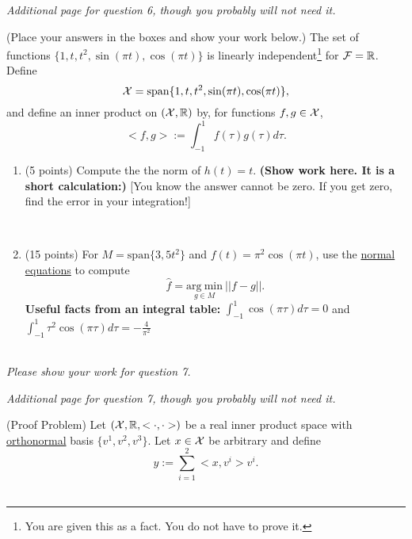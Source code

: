 \documentclass[letterpaper]{article}
\newcommand{\real}{\mathbb R}  %
\newcommand{\spanof}[1]{\textrm{span} \{ #1 \}}
\begin{document}
\newpage
\textit{Additional page for question 6, though you probably will not need it.}
\newpage

  (Place your answers in the boxes and show your work below.) The set of functions $\{1, t, t^2, \sin(\pi t),  \cos(\pi t) \}$ is linearly independent\footnote{You are given this as a fact. You do not have to prove it.} for ${\cal F}=\real$. Define
$$ {\cal X} = \spanof{1, t, t^2, \sin(\pi t),  \cos(\pi t) },$$
and define an inner product on $({\cal X}, \real)$ by, for functions $f,g \in {\cal X}$,
$$<f,g>:= \int_{-1}^{1} f(\tau) g(\tau) d\tau.$$

\begin{enumerate}
\renewcommand{\labelenumi}{(\alph{enumi})}
\setlength{\itemsep}{2cm}
\item (5 points) Compute the the norm of $h(t) = t$. \textbf{(Show work here. It is a short calculation:)} [You know the answer cannot be zero. If you get zero, find the error in your integration!]

\\

\item (15 points) For $M=\spanof{3, 5t^2}$ and $f(t) = \pi^2 \cos(\pi t)$, use the \underline{normal equations} to compute
$$\hat{f} = \underset{g \in M} { \mathrm{arg~min} }~ || f-g||.$$
\noindent \textbf{Useful facts from an integral table:} $\int_{-1}^{1} \cos(\pi \tau ) d \tau = 0$  and $\int_{-1}^{1} \tau ^2 \cos(\pi \tau ) d \tau = -\frac{4}{\pi^2} $\\

\\
\end{enumerate}







\newpage
\textit{Please show your work for question 7.}
\newpage


\textit{Additional page for question 7, though you probably will not need it.}
\newpage

 (Proof Problem) Let $({\cal X}, \real, <\cdot, \cdot>)$ be a real inner product space with \underline{orthonormal} basis $\{v^1, v^2, v^3\}$. Let $x\in {\cal X}$ be arbitrary and define
$$y:= \sum_{i=1}^{2} <x,v^i> v^i.$$\\
\end{document}
